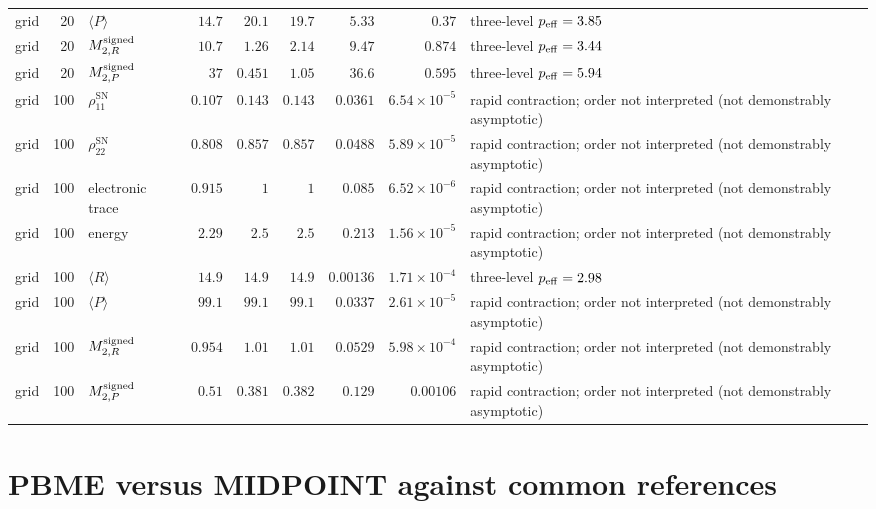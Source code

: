 \documentclass[
  11pt,
  letterpaper,
  onehalfspacing,
  normalmargins,
  equalmargins,
  oneside
]{ut-thesis}
\begin{document}
\begin{landscape}
\begin{longtable}{l r l r r r r r L{0.18\textwidth}}
grid & 20 & $\langle P\rangle$ & $14.7$ & $20.1$ & $19.7$ & $5.33$ & $0.37$ & three-level $p_{\rm eff}=3.85$ \\
grid & 20 & $M^{\rm signed}_{2,R}$ & $10.7$ & $1.26$ & $2.14$ & $9.47$ & $0.874$ & three-level $p_{\rm eff}=3.44$ \\
grid & 20 & $M^{\rm signed}_{2,P}$ & $37$ & $0.451$ & $1.05$ & $36.6$ & $0.595$ & three-level $p_{\rm eff}=5.94$ \\
grid & 100 & $\rho_{11}^{\mathrm{SN}}$ & $0.107$ & $0.143$ & $0.143$ & $0.0361$ & $6.54\times10^{-5}$ & rapid contraction; order not interpreted (not demonstrably asymptotic) \\
grid & 100 & $\rho_{22}^{\mathrm{SN}}$ & $0.808$ & $0.857$ & $0.857$ & $0.0488$ & $5.89\times10^{-5}$ & rapid contraction; order not interpreted (not demonstrably asymptotic) \\
grid & 100 & electronic trace & $0.915$ & $1$ & $1$ & $0.085$ & $6.52\times10^{-6}$ & rapid contraction; order not interpreted (not demonstrably asymptotic) \\
grid & 100 & energy & $2.29$ & $2.5$ & $2.5$ & $0.213$ & $1.56\times10^{-5}$ & rapid contraction; order not interpreted (not demonstrably asymptotic) \\
grid & 100 & $\langle R\rangle$ & $14.9$ & $14.9$ & $14.9$ & $0.00136$ & $1.71\times10^{-4}$ & three-level $p_{\rm eff}=2.98$ \\
grid & 100 & $\langle P\rangle$ & $99.1$ & $99.1$ & $99.1$ & $0.0337$ & $2.61\times10^{-5}$ & rapid contraction; order not interpreted (not demonstrably asymptotic) \\
grid & 100 & $M^{\rm signed}_{2,R}$ & $0.954$ & $1.01$ & $1.01$ & $0.0529$ & $5.98\times10^{-4}$ & rapid contraction; order not interpreted (not demonstrably asymptotic) \\
grid & 100 & $M^{\rm signed}_{2,P}$ & $0.51$ & $0.381$ & $0.382$ & $0.129$ & $0.00106$ & rapid contraction; order not interpreted (not demonstrably asymptotic) \\
\end{longtable}
\endgroup
\end{landscape}

\section{PBME versus MIDPOINT against common references}
\label{sec:results-physical-comparison}
\end{document}
